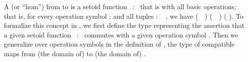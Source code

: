 A  (or ``hom'') from
 to  is a setoid function ~:~  
that is  with all basic operations; that is, for
every operation symbol  :  and all tuples
 : ~  , we have  
(~~)  
(~~)   ( \au{}).
To formalize this concept in \agda, we first define the type 
representing the assertion that a given setoid function
~:~   commutes with a given
operation symbol . Then we generalize over operation symbols in the definition
of , the type of compatible maps from (the domain of)  to
(the domain of) .

